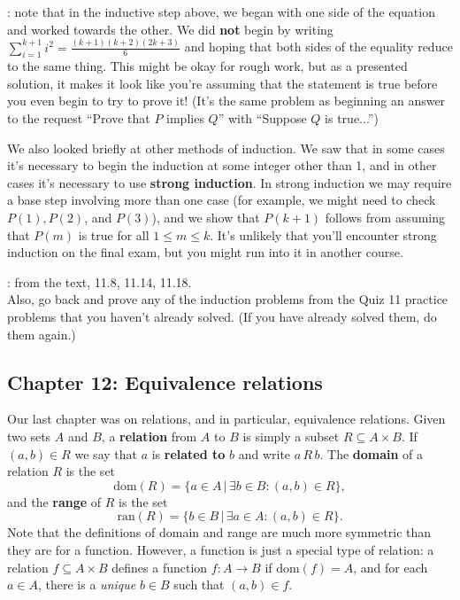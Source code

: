 \documentclass[letterpaper,12pt]{article}
\begin{document}
: note that in the inductive step above, we began with one side of the equation and worked towards the other. We did {\bf not} begin by writing $\sum_{i=1}^{k+1}i^2 = \frac{(k+1)(k+2)(2k+3)}{6}$ and hoping that both sides of the equality reduce to the same thing. This might be okay for rough work, but as a presented solution, it makes it look like you're assuming that the statement is true before you even begin to try to prove it! (It's the same problem as beginning an answer to the request ``Prove that $P$ implies $Q$'' with ``Suppose $Q$ is true...'')

\bigskip

We also looked briefly at other methods of induction. We saw that in some cases it's necessary to begin the induction at some integer other than 1, and in other cases it's necessary to use {\bf strong induction}. In strong induction we may require a base step involving more than one case (for example, we might need to check $P(1), P(2)$, and $P(3)$), and we show that $P(k+1)$ follows from assuming that $P(m)$ is true for all $1\leq m\leq k$. It's unlikely that you'll encounter strong induction on the final exam, but you might run into it in another course.

: from the text, 11.8, 11.14, 11.18.\\
Also, go back and prove any of the induction problems from the Quiz 11 practice problems that you haven't already solved. (If you have already solved them, do them again.)

\subsection*{Chapter 12: Equivalence relations}
Our last chapter was on relations, and in particular, equivalence relations. Given two sets $A$ and $B$, a {\bf relation} from $A$ to $B$ is simply a subset $R\subseteq A\times B$. If $(a,b)\in R$ we say that $a$ is {\bf related to} $b$ and write $a\,R\,b$. The {\bf domain} of a relation $R$ is the set
\[
 \mathrm{dom}(R) = \{a\in A \,|\,\exists b\in B : (a,b)\in R\},
\]
and the {\bf range} of $R$ is the set
\[
 \mathrm{ran}(R) = \{b\in B\,|\, \exists a\in A:  (a,b)\in R\}.
\]
Note that the definitions of domain and range are much more symmetric than they are for a function. However, a function is just a special type of relation: a relation $f\subseteq A\times B$ defines a function $f:A\to B$ if $\mathrm{dom}(f) = A$, and for each $a\in A$, there is a {\em unique} $b\in B$ such that $(a,b)\in f$.
\end{document}
